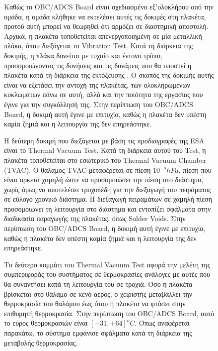 \documentclass[a4paper,nobib,justified]{tufte-book}
\begin{document}
\begin{figure}
Καθώς το OBC/ADCS Board είναι σχεδιασμένο εξ'ολοκλήρου από την ομάδα, η ομάδα κλήθηκε να εκτελέσει αυτές τις δοκιμές στη πλακέτα, προτού αυτή μπορεί να θεωρηθεί ότι αρμόζει σε διαστημική αποστολή. Αρχικά, η πλακέτα τοποθετείται απενεργοποιημένη σε μία μεταλλική πλάκα, όπου διεξάγεται το Vibration Test. Κατά τη διάρκεια της δοκιμής, η πλάκα δονείται με τυχαίο και έντονο τρόπο, προσομοιώνοντας τις δονήσεις και τις δυνάμεις που θα υποστεί η πλακέτα κατά τη διάρκεια της εκτόξευσης . Ο σκοπός της δοκιμής αυτής είναι να εξετάσει την αντοχή της πλακέτας, των ολοκληρωμένων κυκλωμάτων πάνω σε αυτή, αλλά και την ποιότητα της εργασίας που έγινε για την συγκόλλησή της. Στην περίπτωση του OBC/ADCS Board, η δοκιμή αυτή έγινε με επιτυχία, καθώς η πλακέτα δεν υπέστη καμία ζημιά και η λειτουργία της δεν επηρεάστηκε.

Η δεύτερη δοκιμή που διεξάγεται με βάση τις προδιαγραφές της ESA είναι το Thermal Vacuum Test. Κατά τη διάρκεια αυτού του Test, η πλακέτα τοποθετείται στο εσωτερικό του Thermal Vacuum Chamber (TVAC). Ο θάλαμος TVAC μεταφέρεται σε πίεση $10^{-5} hPa$, πίεση που είναι αρκετά χαμηλή ώστε να προσομοιώσει την πίεση στο διάστημα, χωρίς όμως να αποτελέσει τροχοπέδη για την διεξαγωγή του πειράματος σε εύλογο χρονικό διάστημα. Η διεξαγωγή πειραμάτων σε χαμηλή πίεση προσομοιώνει τη λειτουργία στο διάστημα και εντοπίζει σφάλματα στην διαδικασία παραγωγής της πλακέτας, όπως Solder Voids.  Στην περίπτωση του OBC/ADCS Board, η δοκιμή αυτή έγινε με επιτυχία, καθώς η πλακέτα δεν υπέστη καμία ζημιά και η λειτουργία της δεν επηρεάστηκε.

Το δεύτερο κομμάτι του Thermal Vacuum Test αφορά την μελέτη της συμπεριφοράς του συστήματος σε θερμοκρασίες ανάλογες με αυτές που θα συναντήσει κατά τη λειτουργία του σε τροχιά. Όσο η πλακέτα βρίσκεται στο θάλαμο σε κενό αέρος, ο χειριστής μεταβάλλει την θερμοκρασία του θαλάμου έως ότου η πλακέτα να φτάσει στην επιθυμητή θερμοκρασία. Στην περίπτωση του OBC/ADCS Board, αυτό το εύρος θερμοκρασιών είναι $[-31,+64] ^o C$. Όπως αναφέρεται παρακάτω, το σύστημα εμφάνισε σφάλματα κατά τη διάρκεια της μεταβολής θερμοκρασίας.


\end{figure}
\end{document}
